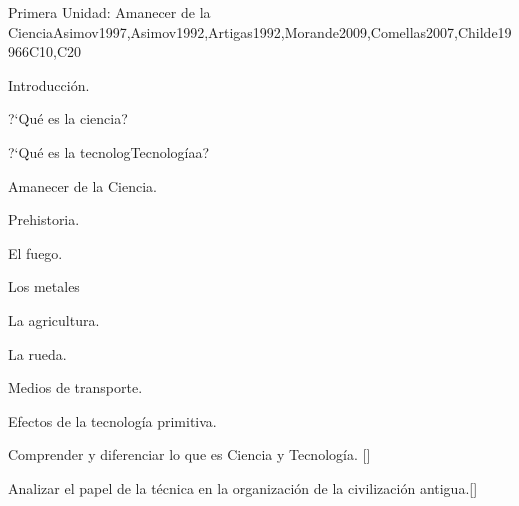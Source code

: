 \begin{syllabus}
\begin{unit}{}{Primera Unidad: Amanecer de la Ciencia}{Asimov1997,Asimov1992,Artigas1992,Morande2009,Comellas2007,Childe1996}{6}{C10,C20}
\begin{topics}
  \item Introducción.
    \begin{subtopics}
      \item ?`Qué es la ciencia?
      \item ?`Qué es la tecnologTecnologíaa?
    \end{subtopics}
  \item Amanecer de la Ciencia.
    \begin{subtopics}
      \item Prehistoria.
      \item El fuego.
      \item Los metales
      \item La agricultura.
      \item La rueda.
      \item Medios de transporte.
      \item Efectos de la tecnología primitiva.
    \end{subtopics}
\end{topics}
\begin{learningoutcomes}
	\item Comprender y diferenciar lo que es Ciencia y Tecnología. [\Familiarity]
	\item Analizar el papel de la técnica en la organización de la civilización antigua.[\Familiarity]
\end{learningoutcomes}
\end{unit}


\end{syllabus}
